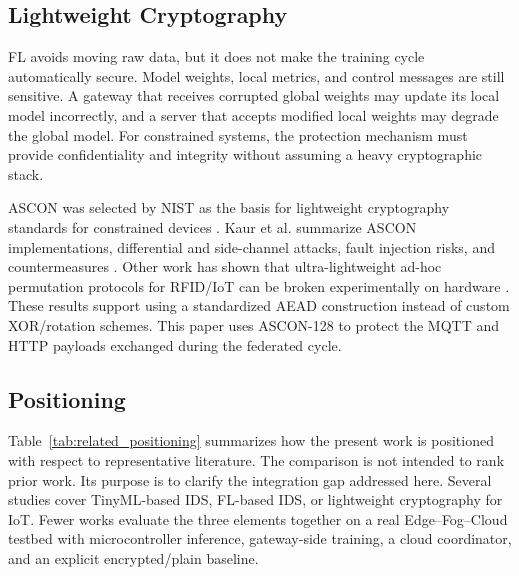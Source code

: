 \documentclass[runningheads]{llncs}
\begin{document}
\subsection{Lightweight Cryptography}

FL avoids moving raw data, but it does not make the training cycle automatically secure. Model weights, local metrics, and control messages are still sensitive. A gateway that receives corrupted global weights may update its local model incorrectly, and a server that accepts modified local weights may degrade the global model. For constrained systems, the protection mechanism must provide confidentiality and integrity without assuming a heavy cryptographic stack.

ASCON was selected by NIST as the basis for lightweight cryptography standards for constrained devices \cite{NISTSP8002322025}. Kaur et al. summarize ASCON implementations, differential and side-channel attacks, fault injection risks, and countermeasures \cite{Kaur2025_ASCON_Survey}. Other work has shown that ultra-lightweight ad-hoc permutation protocols for RFID/IoT can be broken experimentally on hardware \cite{Mirzaali2025_LWC_Permutations}. These results support using a standardized AEAD construction instead of custom XOR/rotation schemes. This paper uses ASCON-128 to protect the MQTT and HTTP payloads exchanged during the federated cycle.

\subsection{Positioning}

Table~\ref{tab:related_positioning} summarizes how the present work is positioned with respect to representative literature. The comparison is not intended to rank prior work. Its purpose is to clarify the integration gap addressed here. Several studies cover TinyML-based IDS, FL-based IDS, or lightweight cryptography for IoT. Fewer works evaluate the three elements together on a real Edge--Fog--Cloud testbed with microcontroller inference, gateway-side training, a cloud coordinator, and an explicit encrypted/plain baseline.
\end{document}
